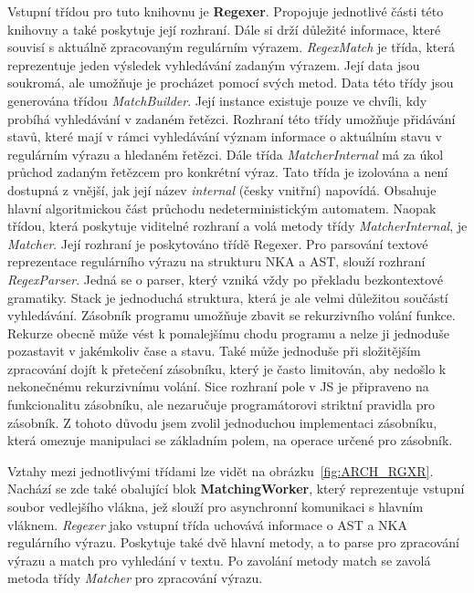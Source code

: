 Vstupní třídou pro tuto knihovnu je \textbf{Regexer}. 
Propojuje jednotlivé části této knihovny a také poskytuje její rozhraní.
Dále si drží důležité informace, které souvisí s aktuálně zpracovaným regulárním výrazem.
\textit{RegexMatch} je třída, která reprezentuje jeden výsledek vyhledávání zadaným výrazem.
Její data jsou soukromá, ale umožňuje je procházet pomocí svých metod.
Data této třídy jsou generována třídou \textit{MatchBuilder}.
Její instance existuje pouze ve chvíli, kdy probíhá vyhledávání v zadaném řetězci.
Rozhraní této třídy umožňuje přidávání stavů, které mají v rámci vyhledávání význam informace o aktuálním stavu v regulárním výrazu a hledaném řetězci.
Dále třída \textit{MatcherInternal} má za úkol průchod zadaným řetězcem pro konkrétní výraz.
Tato třída je izolována a není dostupná z vnější, jak její název \textit{internal} (česky vnitřní) napovídá.
Obsahuje hlavní algoritmickou část průchodu nedeterministickým automatem.
Naopak třídou, která poskytuje viditelné rozhraní a volá metody třídy \textit{MatcherInternal}, je \textit{Matcher}.
Její rozhraní je poskytováno třídě Regexer.
Pro parsování textové reprezentace regulárního výrazu na strukturu NKA a AST, slouží rozhraní \textit{RegexParser}.
Jedná se o parser, který vzniká vždy po překladu bezkontextové gramatiky.
Stack je jednoduchá struktura, která je ale velmi důležitou součástí vyhledávání.
Zásobník programu umožňuje zbavit se rekurzivního volání funkce.
Rekurze obecně může vést k pomalejšímu chodu programu a nelze ji jednoduše pozastavit v jakémkoliv čase a stavu.
Také může jednoduše při složitějším zpracování dojít k přetečení zásobníku, který je často limitován, aby nedošlo k nekonečnému rekurzivnímu volání.
Sice rozhraní pole v JS je připraveno na funkcionalitu zásobníku, ale nezaručuje programátorovi striktní pravidla pro zásobník. 
Z tohoto důvodu jsem zvolil jednoduchou implementaci zásobníku, která omezuje manipulaci se základním polem, na operace určené pro zásobník.

Vztahy mezi jednotlivými třídami lze vidět na obrázku~\ref{fig:ARCH_RGXR}. 
Nachází se zde také obalující blok \textbf{MatchingWorker}, který reprezentuje vstupní soubor vedlejšího vlákna, jež slouží pro asynchronní komunikaci s hlavním vláknem.
\textit{Regexer} jako vstupní třída uchovává informace o AST a NKA regulárního výrazu.
Poskytuje také dvě hlavní metody, a to parse pro zpracování výrazu a match pro vyhledání v textu.
Po zavolání metody match se zavolá metoda třídy \textit{Matcher} pro zpracování výrazu.

